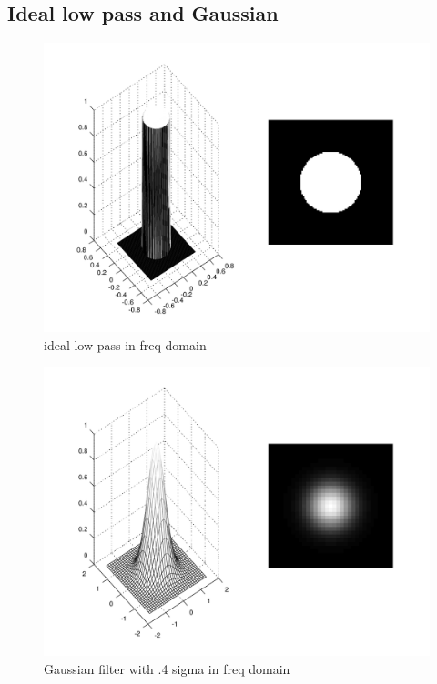 \documentclass{article}
\begin{document}
	\subsection{Ideal low pass and Gaussian}
	\begin{figure}[H]
		\includegraphics[width=\linewidth]{Q7/partD1.png}
		\caption{ideal low pass in freq domain}
	\end{figure}
	\begin{figure}[H]
		\includegraphics[width=\linewidth]{Q7/partD2.png}
		\caption{Gaussian filter with .4 sigma in freq domain}
	\end{figure}
	
\end{document}
